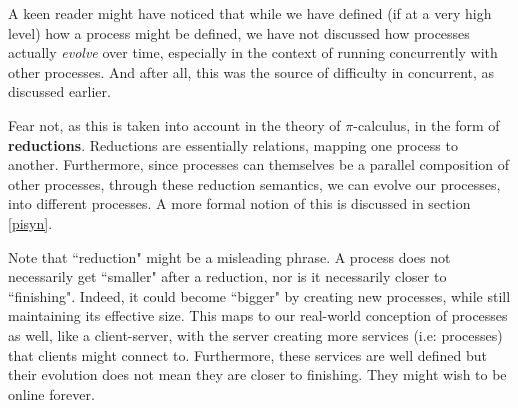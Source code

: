 A keen reader might have noticed that while we have defined (if at a very high level) how a process might be defined, we have not discussed how processes actually \textit{evolve} over time, especially in the context of running concurrently with other processes. And after all, this was the source of difficulty in concurrent, as discussed earlier.

Fear not, as this is taken into account in the theory of $\pi$-calculus, in the form of \textbf{reductions}. Reductions are essentially relations, mapping one process to another. Furthermore, since processes can themselves be a parallel composition of other processes, through these reduction semantics, we can evolve our processes, into different processes. A more formal notion of this is discussed in section \ref{pisyn}.

Note that ``reduction" might be a misleading phrase. A process does not necessarily get ``smaller" after a reduction, nor is it necessarily closer to ``finishing". Indeed, it could become ``bigger" by creating new processes, while still maintaining its effective size. This maps to our real-world conception of processes as well, like a client-server, with the server creating more services (i.e: processes) that clients might connect to. Furthermore, these services are well defined but their evolution does not mean they are closer to finishing. They might wish to be online forever.